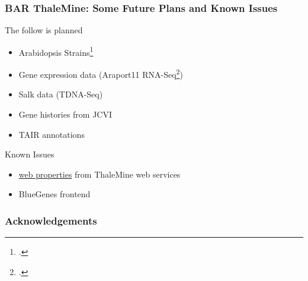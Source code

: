 \documentclass{beamer}
\begin{document}
\begin{frame}
    \frametitle{BAR ThaleMine: Some Future Plans and Known Issues}
    The follow is planned
    \begin{itemize}
        \item Arabidopsis Strains\footcite{strains2019}
        \item Gene expression data (Araport11 RNA-Seq\footcite{cheng2017})
        \item Salk data (TDNA-Seq)
        \item Gene histories from JCVI
        \item TAIR annotations 
    \end{itemize}
    Known Issues
    \begin{itemize}
        \item \href{https://bar.utoronto.ca/thalemine/service/web-properties}{web properties} from ThaleMine web services
        \item BlueGenes frontend
    \end{itemize}
\end{frame}

\begin{frame}
    \frametitle{Acknowledgements}
\end{frame}
\end{document}
